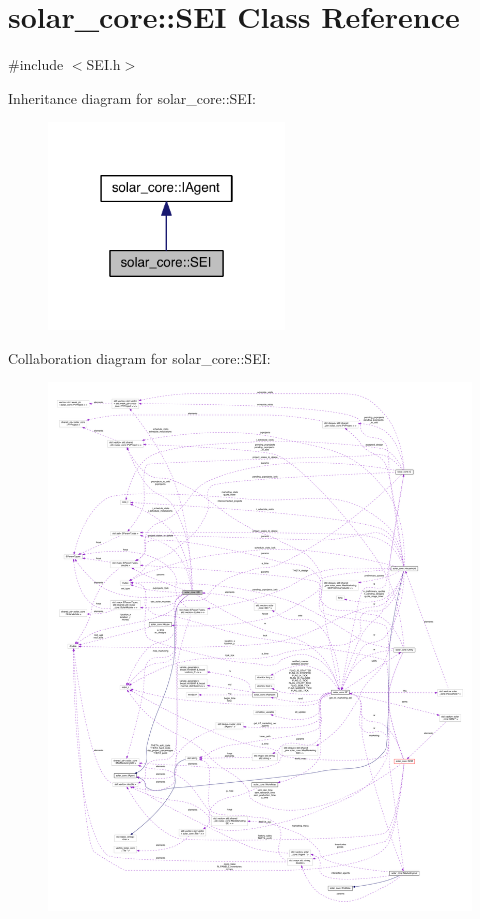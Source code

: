 \hypertarget{classsolar__core_1_1_s_e_i}{}\section{solar\+\_\+core\+:\+:S\+E\+I Class Reference}
\label{classsolar__core_1_1_s_e_i}


{\ttfamily \#include $<$S\+E\+I.\+h$>$}



Inheritance diagram for solar\+\_\+core\+:\+:S\+E\+I\+:\nopagebreak
\begin{figure}[H]
\begin{center}
\leavevmode
\includegraphics[width=178pt]{classsolar__core_1_1_s_e_i__inherit__graph}
\end{center}
\end{figure}


Collaboration diagram for solar\+\_\+core\+:\+:S\+E\+I\+:
\nopagebreak
\begin{figure}[H]
\begin{center}
\leavevmode
\includegraphics[width=350pt]{classsolar__core_1_1_s_e_i__coll__graph}
\end{center}
\end{figure}
